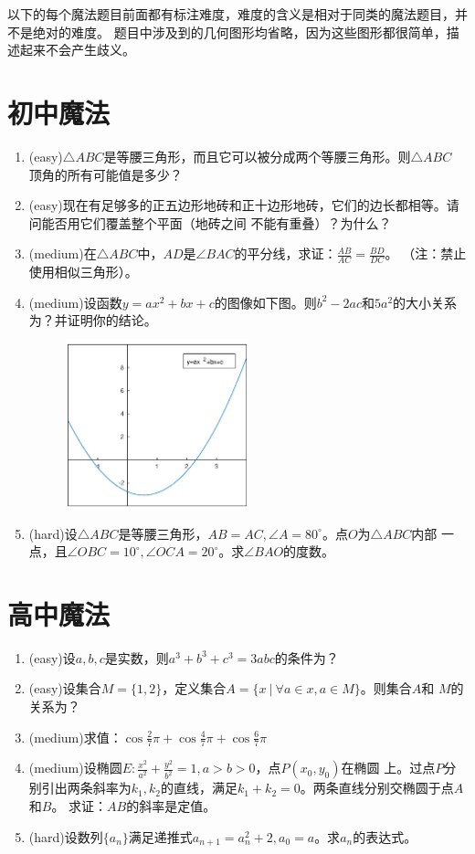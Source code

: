 \documentclass[a4paper]{article}
\begin{document}
以下的每个魔法题目前面都有标注难度，难度的含义是相对于同类的魔法题目，并不是绝对的难度。
题目中涉及到的几何图形均省略，因为这些图形都很简单，描述起来不会产生歧义。
\section{初中魔法}
\begin{enumerate}
\item (easy)$\triangle ABC$是等腰三角形，而且它可以被分成两个等腰三角形。则$\triangle ABC$
顶角的所有可能值是多少？
\item (easy)现在有足够多的正五边形地砖和正十边形地砖，它们的边长都相等。请问能否用它们覆盖整个平面（地砖之间
不能有重叠）？为什么？
\item (medium)在$\triangle ABC$中，$AD$是$\angle BAC$的平分线，求证：$\frac{AB}{AC}=\frac{BD}{DC}$。
（注：禁止使用相似三角形）。
\item (medium)设函数$y=ax^2+bx+c$的图像如下图。则$b^2-2ac$和$5a^2$的大小关系为？并证明你的结论。
\begin{figure}[!hbp]
\centering
\includegraphics[width=0.5\textwidth]{quad.eps}
\end{figure}
\item (hard)设$\triangle ABC$是等腰三角形，$AB=AC,\angle A=80^\circ$。点$O$为$\triangle ABC$内部
一点，且$\angle OBC=10^\circ,\angle OCA=20^\circ$。求$\angle BAO$的度数。
\end{enumerate}
\section{高中魔法}
\begin{enumerate}
\item (easy)设$a,b,c$是实数，则$a^3+b^3+c^3=3abc$的条件为？
\item (easy)设集合$M=\{1,2\}$，定义集合$A=\{x~|~\forall a \in x, a \in M \}$。则集合$A$和
$M$的关系为？
\item (medium)求值：$\cos\frac{2}{7}\pi+\cos\frac{4}{7}\pi+\cos\frac{6}{7}\pi$
\item (medium)设椭圆$E:\frac{x^2}{a^2}+\frac{y^2}{b^2}=1,a>b>0$，点$P(x_0,y_0)$在椭圆
上。过点$P$分别引出两条斜率为$k_1,k_2$的直线，满足$k_1+k_2=0$。两条直线分别交椭圆于点$A$和$B$。
求证：$AB$的斜率是定值。
\item (hard)设数列$\{a_n\}$满足递推式$a_{n+1}=a_n^2+2,a_0=a$。求$a_n$的表达式。
\end{enumerate}
\end{document}
